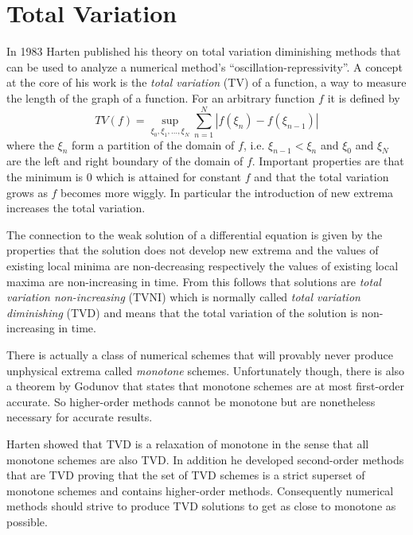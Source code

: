 \section{Total Variation}
\label{sec:total-variation}

In 1983 Harten published his theory on total variation diminishing methods \cite{Harten1983} that can be used to analyze a numerical method's ``oscillation-repressivity''.
A concept at the core of his work is the \emph{total variation} (TV) of a function, a way to measure the length of the graph of a function.
For an arbitrary function $f$ it is defined\cite[Sec. 6.7]{LeVequeFVMforHP} by
\begin{equation*}
  TV(f) = \sup_{\xi_{0}, \xi_{1}, \dots, \xi_{N}} \sum_{n = 1}^{N} |f(\xi_{n}) - f(\xi_{n - 1})|
\end{equation*}
where the $\xi_{n}$ form a partition of the domain of $f$, i.e. $\xi_{n - 1} < \xi_{n}$ and $\xi_{0}$ and $\xi_{N}$ are the left and right boundary of the domain of $f$.
Important properties are that the minimum is $0$ which is attained for constant $f$ and that the total variation grows as $f$ becomes more wiggly.
In particular the introduction of new extrema increases the total variation.

The connection to the weak solution of a differential equation is given by the properties that the solution does not develop new extrema and the values of existing local minima are non-decreasing respectively the values of existing local maxima are non-increasing in time.
From this follows that solutions are \emph{total variation non-increasing} (TVNI) which is normally called \emph{total variation diminishing} (TVD) and means that the total variation of the solution is non-increasing in time.

There is actually a class of numerical schemes that will provably never produce unphysical extrema called \emph{monotone} schemes.
Unfortunately though, there is also a theorem by Godunov\cite{Godunov1959} that states that monotone schemes are at most first-order accurate.
So higher-order methods cannot be monotone but are nonetheless necessary for accurate results.

Harten showed that TVD is a relaxation of monotone in the sense that all monotone schemes are also TVD.
In addition he developed second-order methods that are TVD proving that the set of TVD schemes is a strict superset of monotone schemes and contains higher-order methods.
Consequently numerical methods should strive to produce TVD solutions to get as close to monotone as possible.

